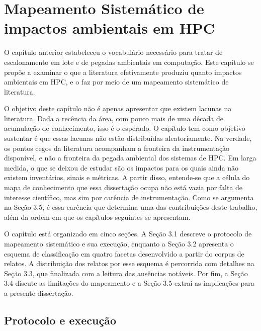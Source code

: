 
\chapter{Mapeamento Sistemático de impactos ambientais em HPC}

O capítulo anterior estabeleceu o vocabulário necessário para tratar de escalonamento em lote
e de pegadas ambientais em computação. Este capítulo se propõe a examinar o que a literatura efetivamente produziu
quanto impactos ambientais em HPC, e o faz por meio de um mapeamento sistemático de literatura.

O objetivo deste capítulo não é apenas apresentar que existem lacunas na literatura. Dada a recência da área,
com pouco mais de uma década de acumulação de conhecimento, isso é o esperado. O capítulo tem como objetivo
sustentar é que essas lacunas não estão distribuídas aleatoriamente. Na verdade, os pontos cegos da literatura
acompanham a fronteira da instrumentação disponível, e não a fronteira da pegada ambiental dos sistemas de HPC.
Em larga medida, o que se deixou de estudar são os impactos para os quais ainda não existem inventários, sinais
e métricas. A partir disso, entende-se que a célula do mapa de conhecimento que essa dissertação ocupa não está
vazia por falta de interesse científico, mas sim por carência de instrumentação. Como se argumenta na Seção 3.5,
é essa carência que determina uma das contribuições deste trabalho, além da ordem em que os capítulos seguintes
se apresentam.

O capítulo está organizado em cinco seções. A Seção 3.1 descreve o protocolo de mapeamento sistemático e sua
execução, enquanto a Seção 3.2 apresenta o esquema de classificação em quatro facetas desenvolvido a partir
do corpus de relatos. A distribuição dos relatos por esse esquema é percorrida com detalhes na Seção 3.3, 
que finalizada com a leitura das ausências notáveis. Por fim, a Seção 3.4 discute as limitações do mapeamento
e a Seção 3.5 extrai as implicações para a presente dissertação. 


\section{Protocolo e execução}

